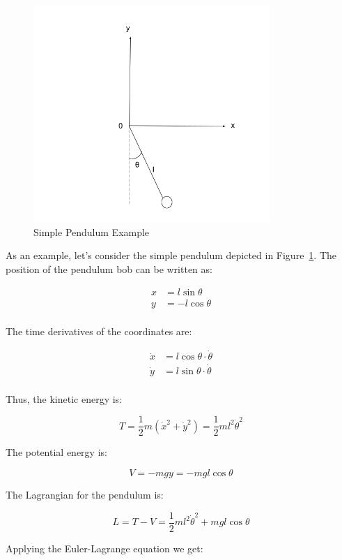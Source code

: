 \begin{figure}[ht]
  \centering
  \includegraphics[width=0.8\textwidth]{images/2-1-1.png}
  \caption{Simple Pendulum Example}
  \label{fig:2-1-1}
\end{figure}

As an example, let's consider the simple pendulum depicted in Figure~\ref{fig:2-1-1}. 
The position of the pendulum bob can be written as:

\begin{align*}
    x &= l \sin{\theta} \\
    y &= -l \cos{\theta} \\
\end{align*}

The time derivatives of the coordinates are:

\begin{align*}
    \dot{x} &= l \cos{\theta} \cdot \dot{\theta} \\
    \dot{y} &= l \sin{\theta} \cdot \dot{\theta} \\
\end{align*}

Thus, the kinetic energy is:

\[
    T=\frac{1}{2} m \left(\dot{x}^2+\dot{y}^2\right) = \frac{1}{2} ml^2\dot{\theta}^2
\]

The potential energy is:

\[
    V=-mgy=-mgl\cos{\theta}
\]

The Lagrangian for the pendulum is:

\[
    L=T-V=\frac{1}{2}ml^2\dot{\theta}^2+mgl\cos{\theta}
\]

Applying the Euler-Lagrange equation we get:

